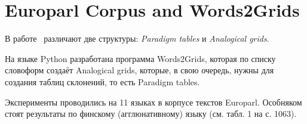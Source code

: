 
\section{Europarl Corpus and Words2Grids}

В работе~\cite{Fam2018tools} различают две структуры: \emph{Paradigm tables} 
и \emph{Analogical grids}. 

На языке Python разработана программа Words2Grids, которая по списку словоформ 
создаёт Analogical grids, которые, в свою очередь, нужны для создания 
таблиц склонений, то есть Paradigm tables.

Эксперименты проводились на 11 языках в корпусе текстов Europarl. 
Особняком стоят результаты по финскому (агглюнативному) языку (см. табл. 1 на с. 1063).



